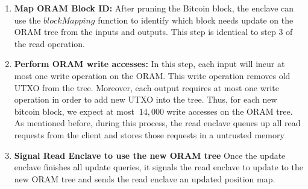 \begin{enumerate}
	\item \textbf{Map ORAM Block ID:} After pruning the Bitcoin block, the enclave can use the $blockMapping$ function to identify which block needs update on the ORAM tree from the inputs and outputs. This step is identical to step 3 of the read operation.
	\item \textbf{Perform ORAM write accesses:} In this step, each input will incur at most one write operation on the ORAM. 
	This write operation removes old UTXO from the tree. 
	Moreover, each output requires at most one write operation in order to add new UTXO into the tree. 
	Thus, for each new bitcoin block, we expect at most $~14,000$ write accesses on the ORAM tree.
	As mentioned before, during this process, the read enclave queues up all read requests from the client and stores those requests in a untrusted memory 

	\item \textbf{Signal Read Enclave to use the new ORAM tree} Once the update enclave finishes all update queries, it signals the read enclave to update to the new ORAM tree and sends the read enclave an updated position map. 


\end{enumerate}
